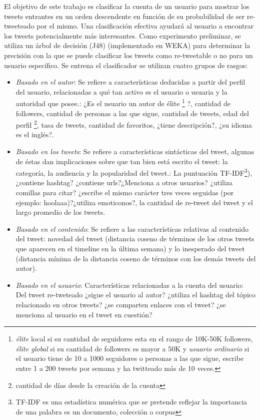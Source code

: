 El objetivo de este trabajo es clasificar la cuenta de un usuario para mostrar los tweets entrantes en un orden descendente en función de su probabilidad de ser re-tweeteado por el mismo. Una clasificación efectiva ayudará al usuario a encontrar los tweets potencialmente más interesantes. Como experimento preliminar, se utiliza un árbol de decisión (J48) (implementado en WEKA) para determinar la precisión con la que se puede clasificar los tweets como re-tweetable o no para un usuario específico. Se entrena el clasificador se utilizan cuatro grupos de rasgos:

\begin{itemize}
	\item \textit{Basado en el autor}: Se refiere a características deducidas a partir del perfil del usuario, relacionadas a qué tan activo es el usuario o usuaria y la autoridad que posee.: ¿Es el usuario un autor de élite \footnote{\emph{élite} local si su cantidad de seguidores esta en el rango de 10K-50K followers, \emph{élite global} si su cantidad de followers es mayor a 50K y \emph{usuario ordinario} si el usuario tiene de 10 a 1000 seguidores o personas a las que sigue, escribe entre 1 a 200 tweets por semana y ha twitteado más de 10 veces.} ?, cantidad de followers, cantidad de personas a las que sigue, cantidad de tweets,  edad del perfil \footnote{cantidad de días desde la creación de la cuenta}, tasa de tweets, cantidad de favoritos, ¿tiene descripción?, ¿su idioma es el inglés?. 
	
	\item \textit{Basado en los tweets}: Se refiere a características sintácticas del tweet, algunas de éstas dan implicaciones sobre que tan bien está escrito el tweet: la categoría, la audiencia y la popularidad del tweet.: La puntuación TF-IDF\footnote{TF-IDF es una estadística numérica que se pretende reflejar la importancia de una palabra es un documento, colección o corpus}), ¿contiene hashtag? ¿contiene urls?¿Menciona a otros usuarios? ¿utiliza comillas para citar? ¿escribe el mismo carácter tres veces seguidas (por ejemplo: hoolaaa)?¿utiliza emoticonos?, la cantidad de re-tweet del tweet y el largo promedio de los tweets.
	
	\item \textit{Basado en el contenido}: Se refiere a las características relativas al contenido del tweet: novedad del tweet (distancia coseno de términos de los otros tweets que aparecen en el timeline en la última semana) y lo inesperado del tweet (distancia mínima de la distancia coseno de términos con los demás tweets del autor).
	
	\item \textit{Basado en el usuario}: Características relacionadas a la cuenta del usuario: Del tweet re-tweteado ¿sigue el usuario al autor? ¿utiliza el hashtag del tópico relacionado en otros tweets? ¿se comparten enlaces con el tweet? ¿se menciona al usuario en el tweet en cuestión?
\end{itemize}

